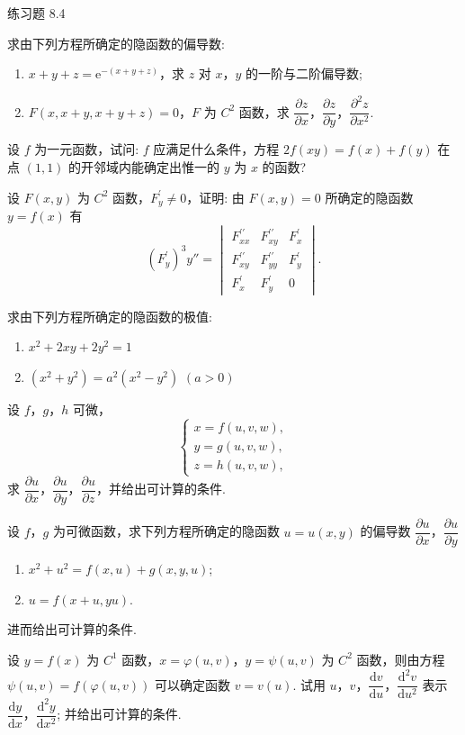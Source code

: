 \begin{exblock}{练习题 8.4}
\item 求由下列方程所确定的隐函数的偏导数:
\begin{enumerate}
  \item[(1)] $x + y + z = \mathrm{e}^{-(x+y+z)}$，求 $z$ 对 $x$，$y$ 的一阶与二阶偏导数;
  \item[(2)] $F(x,x+y,x+y+z) = 0$，$F$ 为 $C^{2}$ 函数，求 $\dfrac{\partial z}{\partial x}$，$\dfrac{\partial z}{\partial y}$，$\dfrac{\partial^{2} z}{\partial x^{2}}$.
\end{enumerate}

\item 设 $f$ 为一元函数，试问: $f$ 应满足什么条件，方程 $2f(xy) = f(x) + f(y)$ 在点 $(1,1)$ 的开邻域内能确定出惟一的 $y$ 为 $x$ 的函数?

\item 设 $F(x,y)$ 为 $C^{2}$ 函数，$F_{y}^{\prime} \neq 0$，证明: 由 $F(x,y) = 0$ 所确定的隐函数 $y = f(x)$ 有
\[
  \left(F_{y}^{\prime}\right)^{3} y'' = \begin{vmatrix} F_{xx}^{\prime\prime} & F_{xy}^{\prime\prime} & F_{x}^{\prime} \\ F_{xy}^{\prime\prime} & F_{yy}^{\prime\prime} & F_{y}^{\prime} \\ F_{x}^{\prime} & F_{y}^{\prime} & 0 \end{vmatrix}.
\]

\item 求由下列方程所确定的隐函数的极值:
\begin{enumerate}
  \item[(1)] $x^{2} + 2xy + 2y^{2} = 1$
  \item[(2)] $(x^{2}+y^{2}) = a^{2}(x^{2}-y^{2})$ $(a > 0)$
\end{enumerate}

\item 设 $f$，$g$，$h$ 可微，
\[
  \begin{cases}
    x = f(u,v,w), \\
    y = g(u,v,w), \\
    z = h(u,v,w),
  \end{cases}
\]
求 $\dfrac{\partial u}{\partial x}$，$\dfrac{\partial u}{\partial y}$，$\dfrac{\partial u}{\partial z}$，并给出可计算的条件.

\item 设 $f$，$g$ 为可微函数，求下列方程所确定的隐函数 $u = u(x,y)$ 的偏导数 $\dfrac{\partial u}{\partial x}$，$\dfrac{\partial u}{\partial y}$
\begin{enumerate}
  \item[(1)] $x^{2} + u^{2} = f(x,u) + g(x,y,u)$;
  \item[(2)] $u = f(x + u,yu)$.
\end{enumerate}
进而给出可计算的条件.

\item 设 $y = f(x)$ 为 $C^{1}$ 函数，$x = \varphi(u,v)$，$y = \psi(u,v)$ 为 $C^{2}$ 函数，则由方程 $\psi(u,v) = f(\varphi(u,v))$ 可以确定函数 $v = v(u)$. 试用 $u$，$v$，$\dfrac{\mathrm{d}v}{\mathrm{d}u}$，$\dfrac{\mathrm{d}^{2}v}{\mathrm{d}u^{2}}$ 表示 $\dfrac{\mathrm{d}y}{\mathrm{d}x}$，$\dfrac{\mathrm{d}^{2}y}{\mathrm{d}x^{2}}$; 并给出可计算的条件.
\end{exblock}

